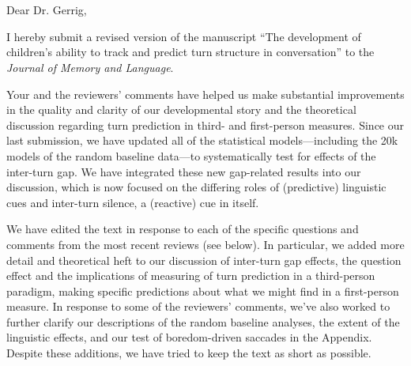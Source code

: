 \documentclass[11pt,a4paper]{letter} %
\def\opening#1{\thispagestyle{empty}
{\centering\fromaddress \vspace{0.6in} \\ %
\hspace*{\longindentation}\hspace*{\fill}\par} %
{\raggedright \toname \\ \toaddress \par} %
\vspace{0.4in} %
\noindent #1 %
}
\begin{document}

\begin{letter}{}


\opening{Dear Dr. Gerrig,}

\smallskip

\noindent I hereby submit a revised version of the manuscript ``The development of children's ability to track and predict turn structure in conversation'' to the \textit{Journal of Memory and Language}.

\noindent Your and the reviewers' comments have helped us make substantial improvements in the quality and clarity of our developmental story and the theoretical discussion regarding turn prediction in third- and first-person measures. Since our last submission, we have updated all of the statistical models---including the 20k models of the random baseline data---to systematically test for effects of the inter-turn gap. We have integrated these new gap-related results into our discussion, which is now focused on the differing roles of (predictive) linguistic cues and inter-turn silence, a (reactive) cue in itself.


\noindent We have edited the text in response to each of the specific questions and comments from the most recent reviews (see below). In particular, we added more detail and theoretical heft to our discussion of inter-turn gap effects, the question effect and the implications of measuring of turn prediction in a third-person paradigm, making specific predictions about what we might find in a first-person measure. In response to some of the reviewers' comments, we've also worked to further clarify our descriptions of the random baseline analyses, the extent of the linguistic effects, and our test of boredom-driven saccades in the Appendix. Despite these additions, we have tried to keep the text as short as possible.


\end{letter}
\end{document}
